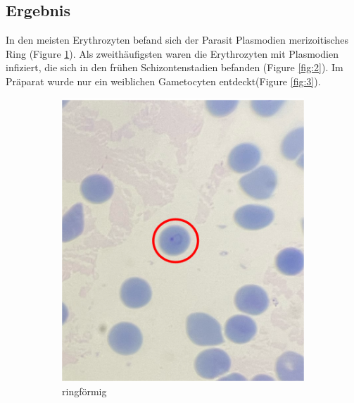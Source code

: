 \documentclass[oneside,10pt,a4paper]{report}
\begin{document}
			\subsection{Ergebnis}
				In den meisten Erythrozyten befand sich der Parasit Plasmodien merizoitisches Ring (Figure \ref{fig:1}). Als zweithäufigsten waren die Erythrozyten mit Plasmodien infiziert, die sich in den frühen Schizontenstadien befanden (Figure \ref{fig:2}). Im Präparat wurde nur ein weiblichen Gametocyten entdeckt(Figure \ref{fig:3}).
				\begin{figure}[H]
					\centering
					\begin{subfigure}[b]{0.3\textwidth}
						\includegraphics[width=\textwidth]{plas3.png}
						\caption{ringförmig}
						\label{fig:1}
					\end{subfigure}
					\hfill
					\begin{subfigure}[b]{0.3\textwidth}

\end{subfigure}
\end{figure}
\end{document}
